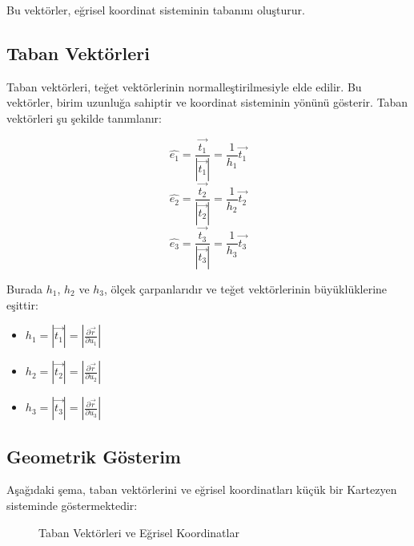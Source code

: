 \documentclass[11pt,letterpaper,twocolumn]{fenbil}
\begin{document}
Bu vektörler, eğrisel koordinat sisteminin tabanını oluşturur.

\subsection{Taban Vektörleri}

Taban vektörleri, teğet vektörlerinin normalleştirilmesiyle elde edilir. Bu vektörler, birim uzunluğa sahiptir ve koordinat sisteminin yönünü gösterir. Taban vektörleri şu şekilde tanımlanır:

\begin{equation}
\hat{e_1} = \frac{\vec{t_1}}{|\vec{t_1}|} = \frac{1}{h_1} \vec{t_1}
\end{equation}
\begin{equation}
\hat{e_2} = \frac{\vec{t_2}}{|\vec{t_2}|} = \frac{1}{h_2} \vec{t_2}
\end{equation}
\begin{equation}
\hat{e_3} = \frac{\vec{t_3}}{|\vec{t_3}|} = \frac{1}{h_3} \vec{t_3}
\end{equation}

Burada $h_1$, $h_2$ ve $h_3$, ölçek çarpanlarıdır ve teğet vektörlerinin büyüklüklerine eşittir:

\begin{itemize}
    \item $h_1 = |\vec{t_1}| = \left| \frac{\partial \vec{r}}{\partial u_1} \right|$
    \item $h_2 = |\vec{t_2}| = \left| \frac{\partial \vec{r}}{\partial u_2} \right|$
    \item $h_3 = |\vec{t_3}| = \left| \frac{\partial \vec{r}}{\partial u_3} \right|$
\end{itemize}

\subsection{Geometrik Gösterim}

Aşağıdaki şema, taban vektörlerini ve eğrisel koordinatları küçük bir Kartezyen sisteminde göstermektedir:

\begin{figure}[htbp]
    \centering
    \caption{Taban Vektörleri ve Eğrisel Koordinatlar}
    \label{fig:taban_vektorleri}
\end{figure}
\end{document}
